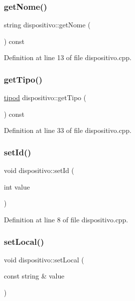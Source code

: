 \subsubsection{\texorpdfstring{get\+Nome()}{getNome()}}
{\footnotesize\ttfamily string dispositivo\+::get\+Nome (\begin{DoxyParamCaption}{ }\end{DoxyParamCaption}) const}



Definition at line 13 of file dispositivo.\+cpp.

\hypertarget{classdispositivo_a8fc01fa7c51737dd1995fd63d3fcd0d2}{}\label{classdispositivo_a8fc01fa7c51737dd1995fd63d3fcd0d2} 
\subsubsection{\texorpdfstring{get\+Tipo()}{getTipo()}}
{\footnotesize\ttfamily \hyperlink{classtipod}{tipod} dispositivo\+::get\+Tipo (\begin{DoxyParamCaption}{ }\end{DoxyParamCaption}) const}



Definition at line 33 of file dispositivo.\+cpp.

\hypertarget{classdispositivo_a1cf6775652391e4ace63b9613295faa6}{}\label{classdispositivo_a1cf6775652391e4ace63b9613295faa6} 
\subsubsection{\texorpdfstring{set\+Id()}{setId()}}
{\footnotesize\ttfamily void dispositivo\+::set\+Id (\begin{DoxyParamCaption}\item[{int}]{value }\end{DoxyParamCaption})}



Definition at line 8 of file dispositivo.\+cpp.

\hypertarget{classdispositivo_aea13deb655b82642c809d925d1460926}{}\label{classdispositivo_aea13deb655b82642c809d925d1460926} 
\subsubsection{\texorpdfstring{set\+Local()}{setLocal()}}
{\footnotesize\ttfamily void dispositivo\+::set\+Local (\begin{DoxyParamCaption}\item[{const string \&}]{value }\end{DoxyParamCaption})}



